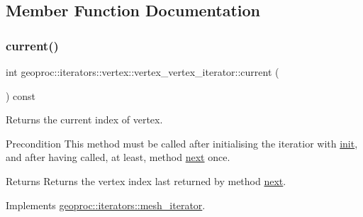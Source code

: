 \subsection{Member Function Documentation}
\mbox{\label{classgeoproc_1_1iterators_1_1vertex_1_1vertex__vertex__iterator_a3e1a4cd5c67b262156017489662ecabc}} 
\subsubsection{\texorpdfstring{current()}{current()}}
{\footnotesize\ttfamily int geoproc\+::iterators\+::vertex\+::vertex\+\_\+vertex\+\_\+iterator\+::current (\begin{DoxyParamCaption}{ }\end{DoxyParamCaption}) const\hspace{0.3cm}{\ttfamily [virtual]}}



Returns the current index of vertex. 

\begin{DoxyPrecond}{Precondition}
This method must be called after initialising the iteratior with \hyperlink{classgeoproc_1_1iterators_1_1vertex_1_1vertex__vertex__iterator_aa25d74c5f4067074ed6926a6d23800b4}{init}, and after having called, at least, method \hyperlink{classgeoproc_1_1iterators_1_1vertex_1_1vertex__vertex__iterator_ad2041720a1d35892804c659de7b2dd44}{next} once. 
\end{DoxyPrecond}
\begin{DoxyReturn}{Returns}
Returns the vertex index last returned by method \hyperlink{classgeoproc_1_1iterators_1_1vertex_1_1vertex__vertex__iterator_ad2041720a1d35892804c659de7b2dd44}{next}. 
\end{DoxyReturn}


Implements \hyperlink{classgeoproc_1_1iterators_1_1mesh__iterator_ae6151b065602980d37a582977083ef42}{geoproc\+::iterators\+::mesh\+\_\+iterator}.

\mbox{\label{classgeoproc_1_1iterators_1_1vertex_1_1vertex__vertex__iterator_aa25d74c5f4067074ed6926a6d23800b4}} 
